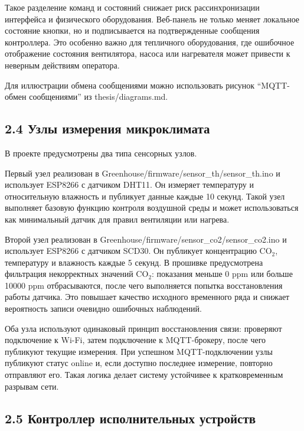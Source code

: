 \documentclass[a4paper,14pt]{extarticle}
\renewcommand{\texttt}[1]{\textnormal{#1}}
\begin{document}
Такое разделение команд и состояний снижает риск рассинхронизации
интерфейса и физического оборудования. Веб-панель не только меняет
локальное состояние кнопки, но и подписывается на подтвержденные
сообщения контроллера. Это особенно важно для тепличного оборудования,
где ошибочное отображение состояния вентилятора, насоса или нагревателя
может привести к неверным действиям оператора.

Для иллюстрации обмена сообщениями можно использовать рисунок
``MQTT-обмен сообщениями'' из \texttt{thesis/diagrams.md}.

\subsection{2.4 Узлы измерения
микроклимата}\label{ux443ux437ux43bux44b-ux438ux437ux43cux435ux440ux435ux43dux438ux44f-ux43cux438ux43aux440ux43eux43aux43bux438ux43cux430ux442ux430}

В проекте предусмотрены два типа сенсорных узлов.

Первый узел реализован в
\texttt{Greenhouse/firmware/sensor\_th/sensor\_th.ino} и использует
ESP8266 с датчиком DHT11. Он измеряет температуру и относительную
влажность и публикует данные каждые 10 секунд. Такой узел выполняет
базовую функцию контроля воздушной среды и может использоваться как
минимальный датчик для правил вентиляции или нагрева.

Второй узел реализован в
\texttt{Greenhouse/firmware/sensor\_co2/sensor\_co2.ino} и использует
ESP8266 с датчиком SCD30. Он публикует концентрацию CO\(_2\),
температуру и влажность каждые 5 секунд. В прошивке предусмотрена
фильтрация некорректных значений CO\(_2\): показания меньше 0 ppm или
больше 10000 ppm отбрасываются, после чего выполняется попытка
восстановления работы датчика. Это повышает качество исходного
временного ряда и снижает вероятность записи очевидно ошибочных
наблюдений.

Оба узла используют одинаковый принцип восстановления связи: проверяют
подключение к Wi-Fi, затем подключение к MQTT-брокеру, после чего
публикуют текущие измерения. При успешном MQTT-подключении узлы
публикуют статус \texttt{online} и, если доступно последнее измерение,
повторно отправляют его. Такая логика делает систему устойчивее к
кратковременным разрывам сети.

\subsection{2.5 Контроллер исполнительных
устройств}\label{ux43aux43eux43dux442ux440ux43eux43bux43bux435ux440-ux438ux441ux43fux43eux43bux43dux438ux442ux435ux43bux44cux43dux44bux445-ux443ux441ux442ux440ux43eux439ux441ux442ux432}
\end{document}
